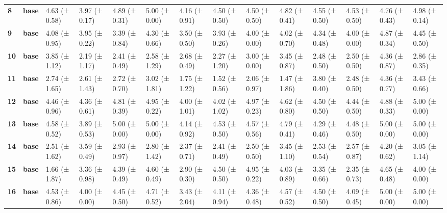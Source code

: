 \begin{longtable}{llllllllllllll}
\cline{1-14}
\textbf{8} & \textbf{base} & 4.63 (± 0.58) & 3.97 (± 0.17) & 4.89 (± 0.31) & 5.00 (± 0.00) & 4.16 (± 0.91) & 4.50 (± 0.50) & 4.50 (± 0.50) & 4.82 (± 0.41) & 4.55 (± 0.50) & 4.53 (± 0.50) & 4.76 (± 0.43) & 4.98 (± 0.14) \\
\cline{1-14}
\textbf{9} & \textbf{base} & 4.08 (± 0.95) & 3.95 (± 0.22) & 3.39 (± 0.84) & 4.30 (± 0.66) & 3.50 (± 0.50) & 3.93 (± 0.26) & 4.00 (± 0.00) & 4.02 (± 0.70) & 4.34 (± 0.48) & 4.00 (± 0.00) & 4.87 (± 0.34) & 4.45 (± 0.50) \\
\cline{1-14}
\textbf{10} & \textbf{base} & 3.85 (± 1.12) & 2.19 (± 1.17) & 2.41 (± 0.49) & 2.58 (± 1.29) & 2.68 (± 0.49) & 2.27 (± 1.20) & 3.00 (± 0.00) & 3.45 (± 0.87) & 2.48 (± 0.50) & 2.50 (± 0.50) & 4.36 (± 0.87) & 2.86 (± 0.35) \\
\cline{1-14}
\textbf{11} & \textbf{base} & 2.74 (± 1.65) & 2.61 (± 1.43) & 2.72 (± 0.70) & 3.02 (± 1.81) & 1.75 (± 1.22) & 1.52 (± 0.56) & 2.06 (± 0.97) & 1.47 (± 1.86) & 3.80 (± 0.40) & 2.48 (± 0.50) & 4.36 (± 0.77) & 3.43 (± 0.66) \\
\cline{1-14}
\textbf{12} & \textbf{base} & 4.46 (± 0.96) & 4.36 (± 0.61) & 4.81 (± 0.39) & 4.95 (± 0.22) & 4.00 (± 1.01) & 4.02 (± 1.02) & 4.97 (± 0.23) & 4.62 (± 0.80) & 4.50 (± 0.50) & 4.44 (± 0.50) & 4.88 (± 0.33) & 5.00 (± 0.00) \\
\cline{1-14}
\textbf{13} & \textbf{base} & 4.58 (± 0.52) & 3.89 (± 0.53) & 5.00 (± 0.00) & 5.00 (± 0.00) & 4.14 (± 0.92) & 4.53 (± 0.50) & 4.57 (± 0.56) & 4.79 (± 0.41) & 4.29 (± 0.46) & 4.48 (± 0.50) & 5.00 (± 0.00) & 5.00 (± 0.00) \\
\cline{1-14}
\textbf{14} & \textbf{base} & 2.51 (± 1.62) & 3.59 (± 0.49) & 2.93 (± 0.97) & 2.80 (± 1.42) & 2.37 (± 0.71) & 2.41 (± 0.49) & 2.50 (± 0.50) & 3.45 (± 1.10) & 2.53 (± 0.54) & 2.57 (± 0.87) & 4.20 (± 0.62) & 3.05 (± 1.14) \\
\cline{1-14}
\textbf{15} & \textbf{base} & 1.66 (± 1.87) & 3.36 (± 0.98) & 4.39 (± 0.49) & 4.60 (± 0.49) & 2.90 (± 0.30) & 4.50 (± 0.50) & 4.95 (± 0.22) & 4.03 (± 0.89) & 3.35 (± 0.66) & 2.35 (± 0.73) & 4.65 (± 0.48) & 4.00 (± 0.00) \\
\cline{1-14}
\textbf{16} & \textbf{base} & 4.53 (± 0.86) & 4.00 (± 0.00) & 4.45 (± 0.50) & 4.71 (± 0.52) & 3.43 (± 2.04) & 4.11 (± 0.94) & 4.36 (± 0.48) & 4.57 (± 0.52) & 4.50 (± 0.50) & 4.09 (± 0.45) & 5.00 (± 0.00) & 5.00 (± 0.00) \\
\cline{1-14}
\end{longtable}
